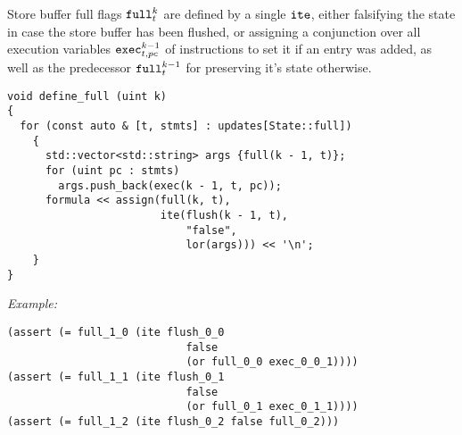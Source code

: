 
\noindent
Store buffer full flags $\texttt{full}^k_t$ are defined by a single
$\texttt{ite}$, either falsifying the state in case the store buffer has been flushed,
or assigning a conjunction over all execution variables $\texttt{exec}^{k - 1}_{t, pc}$ of  instructions to set it if an entry was added, as well as the predecessor $\texttt{full}^{k - 1}_t$ for preserving it's state otherwise.

\begin{lstlisting}[style=c++]
void define_full (uint k)
{
  for (const auto & [t, stmts] : updates[State::full])
    {
      std::vector<std::string> args {full(k - 1, t)};
      for (uint pc : stmts)
        args.push_back(exec(k - 1, t, pc));
      formula << assign(full(k, t),
                        ite(flush(k - 1, t),
                            "false",
                            lor(args))) << '\n';
    }
}
\end{lstlisting}

\noindent
\emph{Example:} 

\begin{lstlisting}[style=smtlib]
(assert (= full_1_0 (ite flush_0_0
                            false
                            (or full_0_0 exec_0_0_1))))
(assert (= full_1_1 (ite flush_0_1
                            false
                            (or full_0_1 exec_0_1_1))))
(assert (= full_1_2 (ite flush_0_2 false full_0_2)))
\end{lstlisting}

